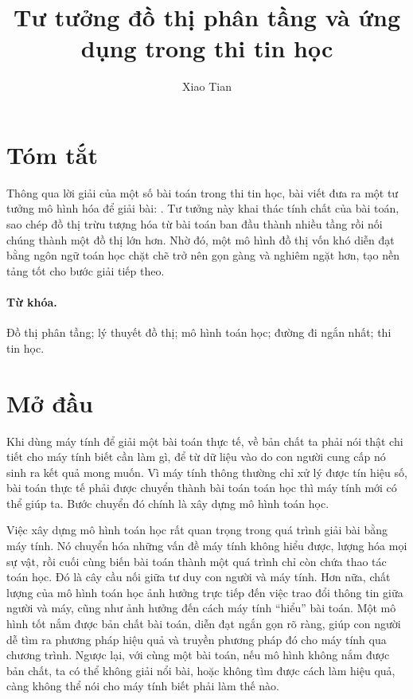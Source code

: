 \documentclass[11pt]{article}
\title{Tư tưởng đồ thị phân tầng và ứng dụng trong thi tin học}
\author{Xiao Tian}
\date{}
\begin{document}
\maketitle


\section*{Tóm tắt}

Thông qua lời giải của một số bài toán trong thi tin học, bài viết đưa ra một
tư tưởng mô hình hóa để giải bài: . Tư tưởng
này khai thác tính chất của bài toán, sao chép đồ thị trừu tượng hóa từ bài
toán ban đầu thành nhiều tầng rồi nối chúng thành một đồ thị lớn hơn. Nhờ đó,
một mô hình đồ thị vốn khó diễn đạt bằng ngôn ngữ toán học chặt chẽ trở nên
gọn gàng và nghiêm ngặt hơn, tạo nền tảng tốt cho bước giải tiếp theo.

\paragraph{Từ khóa.}
Đồ thị phân tầng; lý thuyết đồ thị; mô hình toán học; đường đi ngắn nhất; thi
tin học.

\section{Mở đầu}

Khi dùng máy tính để giải một bài toán thực tế, về bản chất ta phải nói thật
chi tiết cho máy tính biết cần làm gì, để từ dữ liệu vào do con người cung cấp
nó sinh ra kết quả mong muốn. Vì máy tính thông thường chỉ xử lý được tín hiệu
số, bài toán thực tế phải được chuyển thành bài toán toán học thì máy tính mới
có thể giúp ta. Bước chuyển đó chính là xây dựng mô hình toán học.

Việc xây dựng mô hình toán học rất quan trọng trong quá trình giải bài bằng
máy tính. Nó chuyển hóa những vấn đề máy tính không hiểu được, lượng hóa mọi
sự vật, rồi cuối cùng biến bài toán thành một quá trình chỉ còn chứa thao tác
toán học. Đó là cây cầu nối giữa tư duy con người và máy tính. Hơn nữa, chất
lượng của mô hình toán học ảnh hưởng trực tiếp đến việc trao đổi thông tin
giữa người và máy, cũng như ảnh hưởng đến cách máy tính ``hiểu'' bài toán.
Một mô hình tốt nắm được bản chất bài toán, diễn đạt ngắn gọn rõ ràng, giúp
con người dễ tìm ra phương pháp hiệu quả và truyền phương pháp đó cho máy
tính qua chương trình. Ngược lại, với cùng một bài toán, nếu mô hình không
nắm được bản chất, ta có thể không giải nổi bài, hoặc không tìm được cách làm
hiệu quả, càng không thể nói cho máy tính biết phải làm thế nào.
\end{document}
